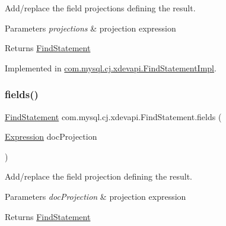 Add/replace the field projections defining the result.


\begin{DoxyParams}{Parameters}
{\em projections} & projection expression \\
\hline
\end{DoxyParams}
\begin{DoxyReturn}{Returns}
\mbox{\hyperlink{interfacecom_1_1mysql_1_1cj_1_1xdevapi_1_1_find_statement}{Find\+Statement}} 
\end{DoxyReturn}


Implemented in \mbox{\hyperlink{classcom_1_1mysql_1_1cj_1_1xdevapi_1_1_find_statement_impl_a0949083d6d4ba7dff81c2ead999373bf}{com.\+mysql.\+cj.\+xdevapi.\+Find\+Statement\+Impl}}.

\mbox{\label{interfacecom_1_1mysql_1_1cj_1_1xdevapi_1_1_find_statement_ad4cbafb2eb15a77355ddcacf12188ba2}} 
\subsubsection{\texorpdfstring{fields()}{fields()}\hspace{0.1cm}{\footnotesize\ttfamily [2/2]}}
{\footnotesize\ttfamily \mbox{\hyperlink{interfacecom_1_1mysql_1_1cj_1_1xdevapi_1_1_find_statement}{Find\+Statement}} com.\+mysql.\+cj.\+xdevapi.\+Find\+Statement.\+fields (\begin{DoxyParamCaption}\item[{\mbox{\hyperlink{classcom_1_1mysql_1_1cj_1_1xdevapi_1_1_expression}{Expression}}}]{doc\+Projection }\end{DoxyParamCaption})}

Add/replace the field projection defining the result.


\begin{DoxyParams}{Parameters}
{\em doc\+Projection} & projection expression \\
\hline
\end{DoxyParams}
\begin{DoxyReturn}{Returns}
\mbox{\hyperlink{interfacecom_1_1mysql_1_1cj_1_1xdevapi_1_1_find_statement}{Find\+Statement}} 
\end{DoxyReturn}


